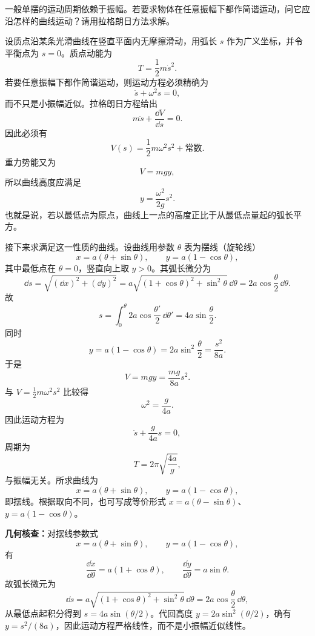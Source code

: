 \begin{question}[等时摆曲线]
一般单摆的运动周期依赖于振幅。若要求物体在任意振幅下都作简谐运动，问它应沿怎样的曲线运动？请用拉格朗日方法求解。

\begin{solution}
设质点沿某条光滑曲线在竖直平面内无摩擦滑动，用弧长 $s$ 作为广义坐标，并令平衡点为 $s=0$。质点动能为
\[
  T=\frac12m\dot s^2.
\]
若要任意振幅下都作简谐运动，则运动方程必须精确为
\[
  \ddot s+\omega^2s=0,
\]
而不只是小振幅近似。拉格朗日方程给出
\[
  m\ddot s+\frac{\dd V}{\dd s}=0.
\]
因此必须有
\[
  V(s)=\frac12m\omega^2s^2+\text{常数}.
\]
重力势能又为
\[
  V=mgy,
\]
所以曲线高度应满足
\[
  y=\frac{\omega^2}{2g}s^2.
\]
也就是说，若以最低点为原点，曲线上一点的高度正比于从最低点量起的弧长平方。

接下来求满足这一性质的曲线。设曲线用参数 $\theta$ 表为摆线（旋轮线）
\[
  x=a(\theta+\sin\theta),
  \qquad
  y=a(1-\cos\theta),
\]
其中最低点在 $\theta=0$，竖直向上取 $y>0$。其弧长微分为
\[
  \dd s=\sqrt{(\dd x)^2+(\dd y)^2}
  =a\sqrt{(1+\cos\theta)^2+\sin^2\theta}\,\dd\theta
  =2a\cos\frac\theta2\,\dd\theta.
\]
故
\[
  s=\int_0^\theta 2a\cos\frac{\theta'}2\,\dd\theta'
   =4a\sin\frac\theta2.
\]
同时
\[
  y=a(1-\cos\theta)=2a\sin^2\frac\theta2
  =\frac{s^2}{8a}.
\]
于是
\[
  V=mgy=\frac{mg}{8a}s^2.
\]
与 $V=\frac12m\omega^2s^2$ 比较得
\[
  \omega^2=\frac{g}{4a}.
\]
因此运动方程为
\[
  \ddot s+\frac{g}{4a}s=0,
\]
周期为
\[
  T=2\pi\sqrt{\frac{4a}{g}},
\]
与振幅无关。所求曲线为
\[
  \boxed{x=a(\theta+\sin\theta),
  \qquad y=a(1-\cos\theta),}
\]
即摆线。根据取向不同，也可写成等价形式 $x=a(\theta-\sin\theta)$、$y=a(1-\cos\theta)$。


\medskip
\textbf{几何核查：}对摆线参数式
\[
  x=a(\theta+\sin\theta),\qquad y=a(1-\cos\theta),
\]
有
\[
  \frac{\dd x}{\dd\theta}=a(1+\cos\theta),
  \qquad
  \frac{\dd y}{\dd\theta}=a\sin\theta.
\]
故弧长微元为
\[
  \dd s=a\sqrt{(1+\cos\theta)^2+\sin^2\theta}\,\dd\theta
  =2a\cos\frac\theta2\,\dd\theta,
\]
从最低点起积分得到 $s=4a\sin(\theta/2)$。代回高度 $y=2a\sin^2(\theta/2)$，确有 $y=s^2/(8a)$，因此运动方程严格线性，而不是小振幅近似线性。
\end{solution}
\end{question}

